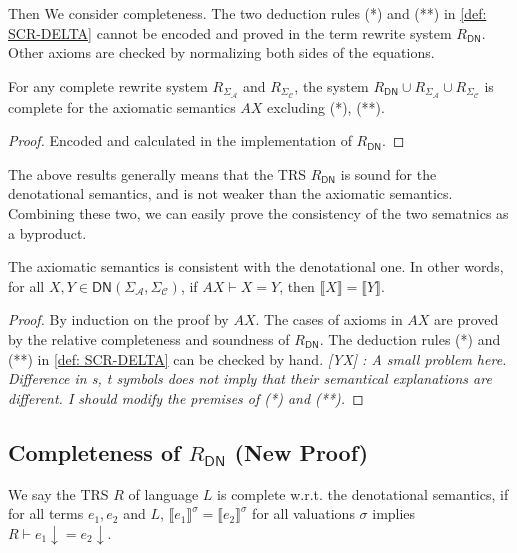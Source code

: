 \documentclass[manuscript, review, timestamp]{acmart}
\newcommand{\yx}[1]{\textit{\color{blue}[YX] : #1}}
\newcommand*{\sem}[1]{{\llbracket #1 \rrbracket}}
\begin{document}
Then We consider completeness. The two deduction rules (*) and (**) in \ref{def: SCR-DELTA} cannot be encoded and proved in the term rewrite system $R_\textsf{DN}$. Other axioms are checked by normalizing both sides of the equations.

\begin{lemma}
  For any complete rewrite system $R_{\Sigma_\mathcal{A}}$ and $R_{\Sigma_\mathcal{C}}$, the system $R_\textsf{DN}\cup R_{\Sigma_\mathcal{A}} \cup R_{\Sigma_\mathcal{C}}$ is complete for the axiomatic semantics $AX$ excluding (*), (**).
\end{lemma}
\begin{proof}
  Encoded and calculated in the implementation of $R_\textsf{DN}$.
\end{proof}

The above results generally means that the TRS $R_\textsf{DN}$ is sound for the denotational semantics, and is not weaker than the axiomatic semantics. Combining these two, we can easily prove the consistency of the two sematnics as a byproduct.

\begin{corollary}
  The axiomatic semantics is consistent with the denotational one. In other words, for all $X, Y \in \textsf{DN}(\Sigma_\mathcal{A}, \Sigma_\mathcal{C})$, if $AX \vdash X = Y$, then $\sem{X} = \sem{Y}$.
\end{corollary}
\begin{proof}
  By induction on the proof by $AX$. The cases of axioms in $AX$ are proved by the relative completeness and soundness of $R_\textsf{DN}$. The deduction rules (*) and (**) in \ref{def: SCR-DELTA} can be checked by hand.
  \yx{A small problem here. Difference in s, t symbols does not imply that their semantical explanations are different. I should modify the premises of (*) and (**).}
\end{proof}

\subsection{Completeness of $R_\textsf{DN}$ (New Proof)}

\begin{definition}[completeness]
  We say the TRS $R$ of language $L$ is complete w.r.t. the denotational semantics, if for all terms $e_1, e_2$ and $L$, 
  $\sem{e_1}^\sigma = \sem{e_2}^\sigma$ for all valuations $\sigma$ implies $R \vdash e_1 \downarrow = e_2 \downarrow$.
\end{definition}
\end{document}
